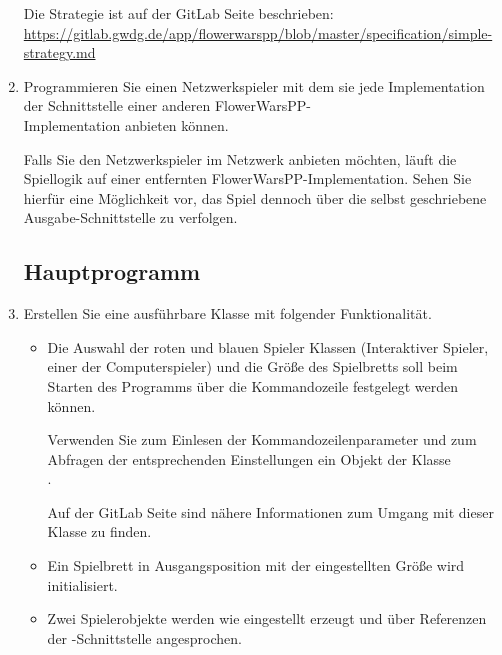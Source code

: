 \begin{enumerate}
Die Strategie ist auf der GitLab Seite beschrieben: \\
\href{https://gitlab.gwdg.de/app/flowerwarspp/blob/master/specification/simple-strategy.md}{https://gitlab.gwdg.de/app/flowerwarspp/blob/master/specification/simple-strategy.md}

\item Programmieren Sie einen Netzwerkspieler mit dem sie jede Implementation der Schnittstelle  einer anderen FlowerWarsPP- \\Implementation anbieten können.

Falls Sie den Netzwerkspieler im Netzwerk anbieten möchten, läuft die Spiellogik auf einer entfernten FlowerWarsPP-Implementation. Sehen Sie hierfür eine Möglichkeit vor, das Spiel dennoch über die selbst geschriebene Ausgabe-Schnittstelle zu verfolgen.


\subsection*{Hauptprogramm}
\item Erstellen Sie eine ausführbare Klasse mit folgender Funktionalität.
\begin{itemize}
\item Die Auswahl der roten und blauen Spieler Klassen (Interaktiver Spieler, einer der Computerspieler) und die Größe des Spielbretts soll beim Starten des Programms über die Kommandozeile festgelegt werden können.

Verwenden Sie zum Einlesen der Kommandozeilenparameter und zum Abfragen der entsprechenden Einstellungen ein Objekt der Klasse \\
.

Auf der GitLab Seite sind nähere Informationen zum Umgang mit dieser Klasse zu finden.

\item Ein Spielbrett in Ausgangsposition mit der eingestellten Größe wird initialisiert.
\item Zwei Spielerobjekte werden wie eingestellt erzeugt und über Referenzen der -Schnittstelle angesprochen. 


\end{itemize}
\end{enumerate}
